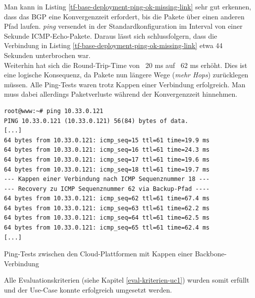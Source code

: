 Man kann in Listing \ref{tf-base-deployment-ping-ok-missing-link} sehr gut erkennen, dass das BGP eine Konvergenzzeit erfordert, bis die Pakete über einen anderen Pfad laufen. \textit{ping} versendet in der Standardkonfiguration im Interval von einer Sekunde ICMP-Echo-Pakete. Daraus lässt sich schlussfolgern, dass die Verbindung in Listing \ref{tf-base-deployment-ping-ok-missing-link} etwa 44 Sekunden unterbrochen war.\\
Weiterhin hat sich die Round-Trip-Time von ~20 ms auf ~62 ms erhöht. Dies ist eine logische Konsequenz, da Pakete nun längere Wege (\textit{mehr Hops}) zurücklegen müssen. Alle Ping-Tests waren trotz Kappen einer Verbindung erfolgreich. Man muss dabei allerdings Paketverluste während der Konvergenzzeit hinnehmen.
\begin{listing}[h]
\begin{verbatim}
root@www:~# ping 10.33.0.121
PING 10.33.0.121 (10.33.0.121) 56(84) bytes of data.
[...]
64 bytes from 10.33.0.121: icmp_seq=15 ttl=61 time=19.9 ms
64 bytes from 10.33.0.121: icmp_seq=16 ttl=61 time=24.3 ms
64 bytes from 10.33.0.121: icmp_seq=17 ttl=61 time=19.6 ms
64 bytes from 10.33.0.121: icmp_seq=18 ttl=61 time=19.7 ms 
--- Kappen einer Verbindung nach ICMP Sequenznummer 18 ---
--- Recovery zu ICMP Sequenznummer 62 via Backup-Pfad ----
64 bytes from 10.33.0.121: icmp_seq=62 ttl=61 time=67.4 ms
64 bytes from 10.33.0.121: icmp_seq=63 ttl=61 time=62.2 ms
64 bytes from 10.33.0.121: icmp_seq=64 ttl=61 time=62.5 ms
64 bytes from 10.33.0.121: icmp_seq=65 ttl=61 time=62.4 ms
[...]
\end{verbatim}
\caption{Ping-Tests zwischen den Cloud-Plattformen mit Kappen einer Backbone-Verbindung}
\label{tf-base-deployment-ping-ok-missing-link}
\end{listing}\FloatBarrier
Alle Evaluationskriterien (siehe Kapitel \ref{eval-kriterien-uc1}) wurden somit erfüllt und der Use-Case konnte erfolgreich umgesetzt werden.
